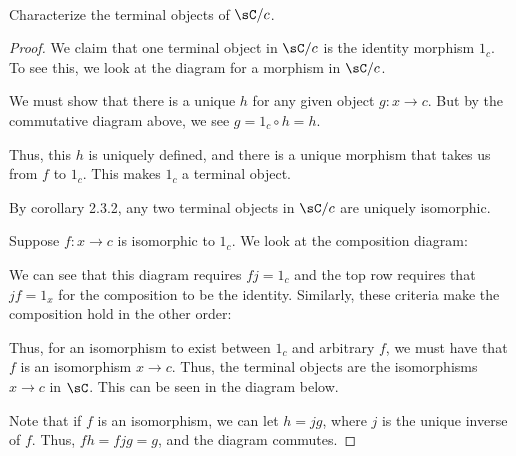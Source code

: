 \documentclass[main.tex]{subfiles}
\begin{document}
\paragraph{}

\begin{exercise}
	Characterize the terminal objects of $\sC/c$.
\end{exercise}

\begin{proof}
We claim that one terminal object in $\sC/c$ is the identity morphism $1_c$.
To see this, we look at the diagram for a morphism in $\sC/c$.


We must show that there is a unique $h$ for any given object $g\colon x \rightarrow c$.  But by the commutative diagram above, we see $g = 1_c \circ h = h$.

Thus, this $h$ is uniquely defined, and there is a unique morphism that takes us from $f$ to $1_c$. This makes $1_c$ a terminal object.

 By corollary 2.3.2, any two terminal objects in $\sC/c$ are uniquely isomorphic.  

Suppose $f\colon x\rightarrow c$ is isomorphic to $1_c$.  We look at the composition diagram:


We can see that this diagram requires $fj = 1_c$ and the top row requires that $jf = 1_x$ for the composition to be the identity.  Similarly, these criteria make the composition hold in the other order:


Thus, for an isomorphism to exist between $1_c$ and arbitrary $f$, we must have
that $f$ is an isomorphism $x \rightarrow c$.  Thus, the terminal objects are
the isomorphisms $x \rightarrow c$ in $\sC$.  This can be seen in the diagram
below.


Note that if $f$ is an isomorphism, we can let $h = jg$, where $j$ is the unique inverse of $f$.  Thus, $fh = fjg = g$, and the diagram commutes.
\end{proof}
\end{document}
